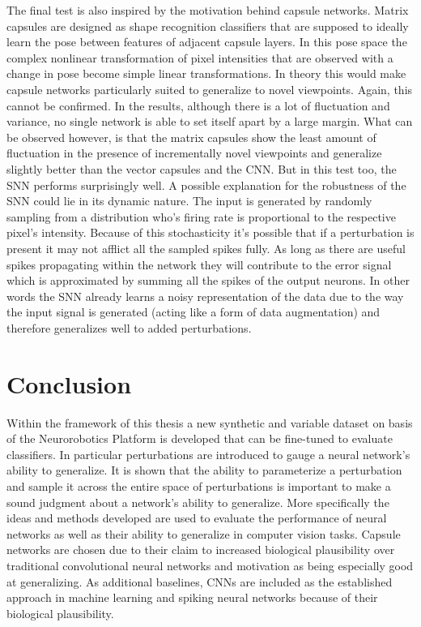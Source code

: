 The final test is also inspired by the motivation behind capsule networks. Matrix capsules are designed as shape recognition classifiers that are supposed to ideally learn the pose between features of adjacent capsule layers. In this pose space the complex nonlinear transformation of pixel intensities that are observed with a change in pose become simple linear transformations. In theory this would make capsule networks particularly suited to generalize to novel viewpoints. Again, this cannot be confirmed. In the results, although there is a lot of fluctuation and variance, no single network is able to set itself apart by a large margin. What can be observed however, is that the matrix capsules show the least amount of fluctuation in the presence of incrementally novel viewpoints and generalize slightly better than the vector capsules and the CNN. But in this test too, the SNN performs surprisingly well. A possible explanation for the robustness of the SNN could lie in its dynamic nature. The input is generated by randomly sampling from a distribution who's firing rate is proportional to the respective pixel's intensity. Because of this stochasticity it's possible that if a perturbation is present it may not afflict all the sampled spikes fully. As long as there are useful spikes propagating within the network they will contribute to the error signal which is approximated by summing all the spikes of the output neurons. In other words the SNN already learns a noisy representation of the data due to the way the input signal is generated (acting like a form of data augmentation) and therefore generalizes well to added perturbations.
\section{Conclusion}
Within the framework of this thesis a new synthetic and variable dataset on basis of the Neurorobotics Platform is developed that can be fine-tuned to evaluate classifiers. In particular perturbations are introduced to gauge a neural network’s ability to generalize. It is shown that the ability to parameterize a perturbation and sample it across the entire space of perturbations is important to make a sound judgment about a network’s ability to generalize. More specifically the ideas and methods developed are used to evaluate the performance of neural networks as well as their ability to generalize in computer vision tasks. Capsule networks are chosen due to their claim to increased biological plausibility over traditional convolutional neural networks and motivation as being especially good at generalizing. As additional baselines, CNNs are included as the established approach in machine learning and spiking neural networks because of their biological plausibility.

